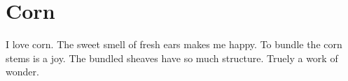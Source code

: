 


\section{Corn}
I love corn. The sweet smell of fresh ears makes me happy. To bundle the corn stems is a joy. The bundled sheaves have so much structure. Truely a work of wonder.

